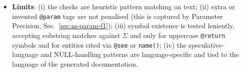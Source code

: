 \begin{itemize}[leftmargin=*, label=\textbullet]
	\item \textbf{Limits}: (i) the checks are heuristic pattern matching on text; (ii) extra or
	invented \texttt{@param} tags are not penalised (this is captured by Parameter Precision,
	Sec.~\ref{sec:m-param-f1}); (iii) symbol existence is tested leniently, accepting substring
	matches against $\Sigma$ and only for uppercase \texttt{@return} symbols and for entities cited
	via \texttt{@see} or \texttt{name()}; (iv) the speculative-language and NULL-handling patterns are
	language-specific and tied to the language of the generated documentation.
\end{itemize}


